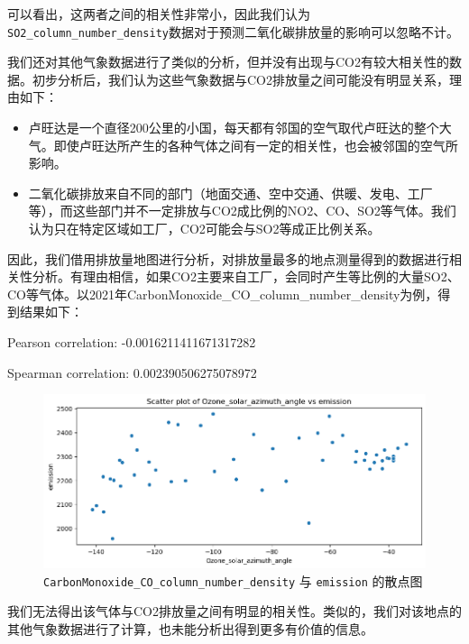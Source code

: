 \documentclass{ctexart}
\begin{document}
可以看出，这两者之间的相关性非常小，因此我们认为\texttt{SO2\_column\_number\_density}数据对于预测二氧化碳排放量的影响可以忽略不计。

我们还对其他气象数据进行了类似的分析，但并没有出现与CO2有较大相关性的数据。初步分析后，我们认为这些气象数据与CO2排放量之间可能没有明显关系，理由如下：

\begin{itemize}
      \item 卢旺达是一个直径200公里的小国，每天都有邻国的空气取代卢旺达的整个大气。即使卢旺达所产生的各种气体之间有一定的相关性，也会被邻国的空气所影响。
      \item 二氧化碳排放来自不同的部门（地面交通、空中交通、供暖、发电、工厂等），而这些部门并不一定排放与CO2成比例的NO2、CO、SO2等气体。我们认为只在特定区域如工厂，CO2可能会与SO2等成正比例关系。
\end{itemize}

因此，我们借用排放量地图进行分析，对排放量最多的地点测量得到的数据进行相关性分析。有理由相信，如果CO2主要来自工厂，会同时产生等比例的大量SO2、CO等气体。以2021年CarbonMonoxide\_CO\_column\_number\_density为例，得到结果如下：

\begin{center}
      Pearson correlation: -0.0016211411671317282

      Spearman correlation: 0.002390506275078972
\end{center}

\begin{figure}[H]
      \centering
      \includegraphics[width=1\textwidth]{output7.png}
      \caption{\label{fig:7}\texttt{CarbonMonoxide\_CO\_column\_number\_density} 与 \texttt{emission} 的散点图}
\end{figure}

我们无法得出该气体与CO2排放量之间有明显的相关性。类似的，我们对该地点的其他气象数据进行了计算，也未能分析出得到更多有价值的信息。
\end{document}

